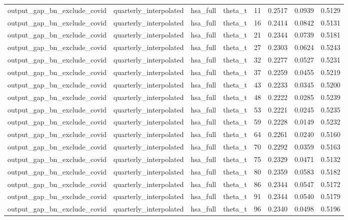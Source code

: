 \begin{tabular}{llllrrrr}
output\_gap\_bn\_exclude\_covid & quarterly\_interpolated & hsa\_full & theta\_t & 11 & 0.2517 & 0.0939 & 0.5129 \\
output\_gap\_bn\_exclude\_covid & quarterly\_interpolated & hsa\_full & theta\_t & 16 & 0.2414 & 0.0842 & 0.5131 \\
output\_gap\_bn\_exclude\_covid & quarterly\_interpolated & hsa\_full & theta\_t & 21 & 0.2344 & 0.0739 & 0.5181 \\
output\_gap\_bn\_exclude\_covid & quarterly\_interpolated & hsa\_full & theta\_t & 27 & 0.2303 & 0.0624 & 0.5243 \\
output\_gap\_bn\_exclude\_covid & quarterly\_interpolated & hsa\_full & theta\_t & 32 & 0.2277 & 0.0527 & 0.5231 \\
output\_gap\_bn\_exclude\_covid & quarterly\_interpolated & hsa\_full & theta\_t & 37 & 0.2259 & 0.0455 & 0.5219 \\
output\_gap\_bn\_exclude\_covid & quarterly\_interpolated & hsa\_full & theta\_t & 43 & 0.2233 & 0.0345 & 0.5200 \\
output\_gap\_bn\_exclude\_covid & quarterly\_interpolated & hsa\_full & theta\_t & 48 & 0.2222 & 0.0285 & 0.5239 \\
output\_gap\_bn\_exclude\_covid & quarterly\_interpolated & hsa\_full & theta\_t & 53 & 0.2221 & 0.0245 & 0.5235 \\
output\_gap\_bn\_exclude\_covid & quarterly\_interpolated & hsa\_full & theta\_t & 59 & 0.2228 & 0.0149 & 0.5232 \\
output\_gap\_bn\_exclude\_covid & quarterly\_interpolated & hsa\_full & theta\_t & 64 & 0.2261 & 0.0240 & 0.5160 \\
output\_gap\_bn\_exclude\_covid & quarterly\_interpolated & hsa\_full & theta\_t & 70 & 0.2292 & 0.0359 & 0.5163 \\
output\_gap\_bn\_exclude\_covid & quarterly\_interpolated & hsa\_full & theta\_t & 75 & 0.2329 & 0.0471 & 0.5132 \\
output\_gap\_bn\_exclude\_covid & quarterly\_interpolated & hsa\_full & theta\_t & 80 & 0.2359 & 0.0583 & 0.5182 \\
output\_gap\_bn\_exclude\_covid & quarterly\_interpolated & hsa\_full & theta\_t & 86 & 0.2344 & 0.0547 & 0.5172 \\
output\_gap\_bn\_exclude\_covid & quarterly\_interpolated & hsa\_full & theta\_t & 91 & 0.2344 & 0.0540 & 0.5179 \\
output\_gap\_bn\_exclude\_covid & quarterly\_interpolated & hsa\_full & theta\_t & 96 & 0.2340 & 0.0498 & 0.5196 \\

\end{tabular}
